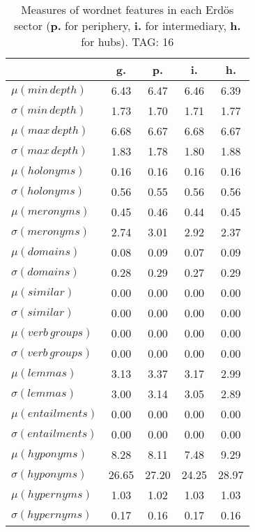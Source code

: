 \begin{table}[h!]
\begin{center}
\begin{tabular}{| l | c | c | c | c |}\hline
 & g. & p. & i. & h. \\\hline
$\mu(min\,depth)$ & 6.43  & 6.47  & 6.46  & 6.39 \\\hline
$\sigma(min\,depth)$ & 1.73  & 1.70  & 1.71  & 1.77 \\\hline
$\mu(max\,depth)$ & 6.68  & 6.67  & 6.68  & 6.67 \\\hline
$\sigma(max\,depth)$ & 1.83  & 1.78  & 1.80  & 1.88 \\\hline
$\mu(holonyms)$ & 0.16  & 0.16  & 0.16  & 0.16 \\\hline
$\sigma(holonyms)$ & 0.56  & 0.55  & 0.56  & 0.56 \\\hline
$\mu(meronyms)$ & 0.45  & 0.46  & 0.44  & 0.45 \\\hline
$\sigma(meronyms)$ & 2.74  & 3.01  & 2.92  & 2.37 \\\hline
$\mu(domains)$ & 0.08  & 0.09  & 0.07  & 0.09 \\\hline
$\sigma(domains)$ & 0.28  & 0.29  & 0.27  & 0.29 \\\hline
$\mu(similar)$ & 0.00  & 0.00  & 0.00  & 0.00 \\\hline
$\sigma(similar)$ & 0.00  & 0.00  & 0.00  & 0.00 \\\hline
$\mu(verb\,groups)$ & 0.00  & 0.00  & 0.00  & 0.00 \\\hline
$\sigma(verb\,groups)$ & 0.00  & 0.00  & 0.00  & 0.00 \\\hline
$\mu(lemmas)$ & 3.13  & 3.37  & 3.17  & 2.99 \\\hline
$\sigma(lemmas)$ & 3.00  & 3.14  & 3.05  & 2.89 \\\hline
$\mu(entailments)$ & 0.00  & 0.00  & 0.00  & 0.00 \\\hline
$\sigma(entailments)$ & 0.00  & 0.00  & 0.00  & 0.00 \\\hline
$\mu(hyponyms)$ & 8.28  & 8.11  & 7.48  & 9.29 \\\hline
$\sigma(hyponyms)$ & 26.65  & 27.20  & 24.25  & 28.97 \\\hline
$\mu(hypernyms)$ & 1.03  & 1.02  & 1.03  & 1.03 \\\hline
$\sigma(hypernyms)$ & 0.17  & 0.16  & 0.17  & 0.16 \\\hline
\end{tabular}
\caption{Measures of wordnet features in each Erd\"os sector ({{\bf p.}} for periphery, {{\bf i.}} for intermediary, {{\bf h.}} for hubs). TAG: 16}
\end{center}
\end{table}